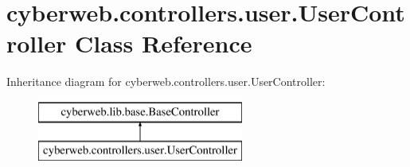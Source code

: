 \hypertarget{classcyberweb_1_1controllers_1_1user_1_1_user_controller}{\section{cyberweb.\-controllers.\-user.\-User\-Controller \-Class \-Reference}
\label{classcyberweb_1_1controllers_1_1user_1_1_user_controller}
}
\-Inheritance diagram for cyberweb.\-controllers.\-user.\-User\-Controller\-:\begin{figure}[H]
\begin{center}
\leavevmode
\includegraphics[height=2.000000cm]{classcyberweb_1_1controllers_1_1user_1_1_user_controller}
\end{center}
\end{figure}
